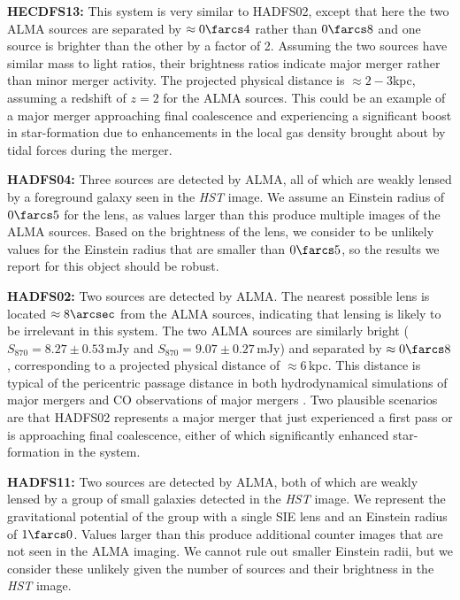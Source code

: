 \documentclass[iop]{emulateapj}
\begin{document}
{\bf HECDFS13:} This system is very similar to HADFS02, except that here the two
ALMA sources are separated by $\approx 0\farcs4$ rather than $0\farcs8$ and one
source is brighter than the other by a factor of 2.  Assuming the two sources
have similar mass to light ratios, their brightness ratios indicate major
merger rather than minor merger activity.  The projected physical distance is
$\approx 2-3$kpc, assuming a redshift of $z=2$ for the ALMA sources.  This
could be an example of a major merger approaching final coalescence and
experiencing a significant boost in star-formation due to enhancements in the
local gas density brought about by tidal forces during the merger.

{\bf HADFS04:} Three sources are detected by ALMA, all of which are weakly
lensed by a foreground galaxy seen in the {\it HST} image.  We assume an
Einstein radius of $0\farcs5$ for the lens, as values larger than this produce
multiple images of the ALMA sources.  Based on the brightness of the lens, we
consider to be unlikely values for the Einstein radius that are smaller than
$0\farcs5$, so the results we report for this object should be robust.

{\bf HADFS02:} Two sources are detected by ALMA.  The nearest possible lens is
located $\approx 8\arcsec$ from the ALMA sources, indicating that lensing is
likely to be irrelevant in this system.  The two ALMA sources are similarly
bright ($S_{870} = 8.27 \pm 0.53\,$mJy and $S_{870} = 9.07 \pm 0.27\,$mJy) and
separated by $\approx 0\farcs8$, corresponding to a projected physical distance
of $\approx 6\,$kpc. This distance is typical of the pericentric passage
distance in both hydrodynamical simulations of major mergers
\citep[e.g.,][]{Hayward:2012lr} and CO observations of major mergers
\citep[e.g.,][]{2008ApJ...680..246T, 2010ApJ...724..233E, 2011ApJ...733L..11R,
2011MNRAS.412.1913I}.  Two plausible scenarios are that HADFS02 represents a
major merger that just experienced a first pass or is approaching final
coalescence, either of which significantly enhanced star-formation in the
system.

{\bf HADFS11:} Two sources are detected by ALMA, both of which are weakly
lensed by a group of small galaxies detected in the {\it HST} image.  We
represent the gravitational potential of the group with a single SIE lens and
an Einstein radius of $1\farcs0$.  Values larger than this produce additional
counter images that are not seen in the ALMA imaging.  We cannot rule out
smaller Einstein radii, but we consider these unlikely given the number of
sources and their brightness in the {\it HST} image.
\end{document}
